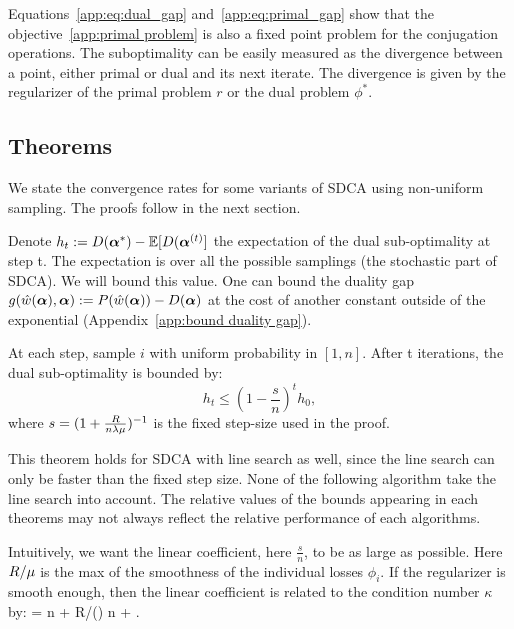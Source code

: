 \begin{subappendices}
Equations~\eqref{app:eq:dual_gap} and~\eqref{app:eq:primal_gap} show that the objective~\eqref{app:primal problem} is also a fixed point problem for the conjugation operations.
The suboptimality can be easily measured as the divergence between a point, either primal or dual and its next iterate.
The divergence is given by the regularizer of the primal problem $r$ or the dual problem $\phi^*$.

\subsection{Theorems}
\label{app:theorem}

We state the convergence rates for some variants of SDCA using non-uniform sampling. The proofs follow in the next section.

Denote $h_t := D(\boldsymbol{\alpha}^*) - \operatorname{\mathbb{E}}[D(\boldsymbol{\alpha}^{(t)} ]$ the expectation of the dual sub-optimality at step t.
The expectation is over all the possible samplings (the stochastic part of SDCA).
We will bound this value.
One can bound the duality gap $g(\hat w(\boldsymbol{\alpha}),\boldsymbol{\alpha}) := P(\hat w(\boldsymbol{\alpha})) - D(\boldsymbol{\alpha})$ at the cost of another constant outside of the exponential (Appendix~\ref{app:bound duality gap}).

\begin{theorem}
	\label{app:th:uniform}
	At each step, sample $i$ with uniform probability in $[1,n]$.
	After t iterations, the dual sub-optimality is bounded by:
	\begin{equation}
		h_t \leq (1-\frac{s}{n})^t  h_0,
	\end{equation}
	where $ s = (1+ \frac{R}{n \lambda \mu} )^{-1} $ is the fixed step-size used in the proof.
\end{theorem}

This theorem holds for SDCA with line search as well, since the line search can only be faster than the fixed step size.
None of the following algorithm take the line search into account.
The relative values of the bounds appearing in each theorems may not always reflect the relative
performance of each algorithms.

Intuitively, we want the linear coefficient, here $\frac{s}{n}$, to be as large as possible.
Here $R/\mu$ is the max of the smoothness of the individual losses $\phi_i$.
If the regularizer is smooth enough, then the linear coefficient is related to the condition number $\kappa$ by:
\beq
{}  = n + R/(\lambda \strgconvex) \approx n + \kappa.
\eeq


\end{subappendices}
